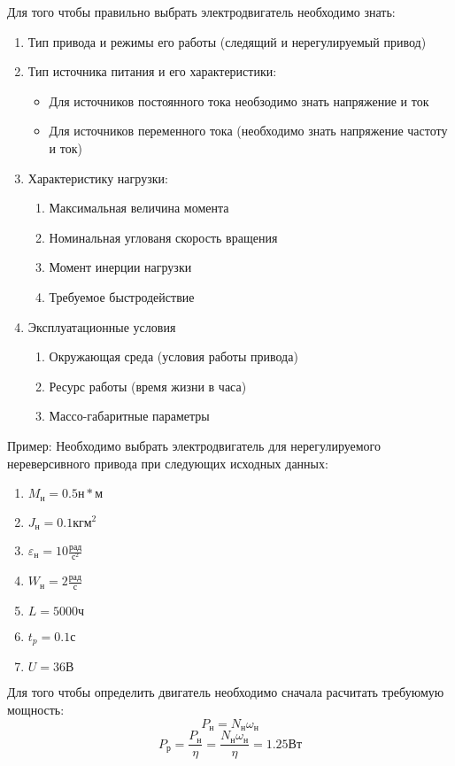\documentclass{article}
\begin{document}
Для того чтобы правильно выбрать электродвигатель необходимо знать:
\begin{enumerate}
	\item Тип привода и режимы его работы (следящий и нерегулируемый привод)
	\item Тип источника питания и его характеристики:
	\begin{itemize}
		\item Для источников постоянного тока необзодимо знать напряжение и ток
		\item Для источников переменного тока (необходимо знать напряжение частоту и ток)
	\end{itemize}
	\item Характеристику нагрузки:
	\begin{enumerate}
		\item Максимальная величина момента
		\item Номинальная углованя скорость вращения
		\item Момент инерции нагрузки
		\item Требуемое быстродействие
	\end{enumerate}
	\item Эксплуатационные условия
	\begin{enumerate}
		\item Окружающая среда (условия работы привода)
		\item Ресурс работы (время жизни в часа)
		\item Массо-габаритные параметры
	\end{enumerate}
\end{enumerate}

Пример: Необходимо выбрать электродвигатель для нерегулируемого нереверсивного привода при следующих исходных данных:
\begin{enumerate}
	\item $M_н = 0.5 н * м$
	\item $J_н = 0.1 кг м^2$
	\item $\varepsilon_н = 10 \frac{рад}{с^2}$
	\item $W_н = 2 \frac{рад}{с} $
	\item $L = 5000 ч$
	\item $t_p = 0.1 с$
	\item $U = 36 В$
\end{enumerate}

Для того чтобы определить двигатель необходимо сначала расчитать требуюмую мощность:
$$
P_н = N_н \omega_н
$$
$$
P_р = \frac{P_н}{\eta} = \frac{N_н \omega_н}{ \eta} = 1.25 Вт
$$
\end{document}
